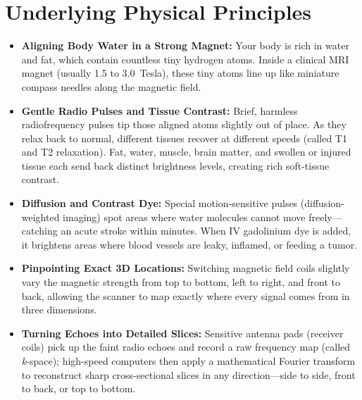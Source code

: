\section{Underlying Physical Principles}
\begin{itemize}
\item \textbf{Aligning Body Water in a Strong Magnet:} Your body is rich in water and fat, which contain countless tiny hydrogen atoms. Inside a clinical MRI magnet (usually 1.5 to 3.0~Tesla), these tiny atoms line up like miniature compass needles along the magnetic field.
\item \textbf{Gentle Radio Pulses and Tissue Contrast:} Brief, harmless radiofrequency pulses tip those aligned atoms slightly out of place. As they relax back to normal, different tissues recover at different speeds (called T1 and T2 relaxation). Fat, water, muscle, brain matter, and swollen or injured tissue each send back distinct brightness levels, creating rich soft-tissue contrast.
\item \textbf{Diffusion and Contrast Dye:} Special motion-sensitive pulses (diffusion-weighted imaging) spot areas where water molecules cannot move freely---catching an acute stroke within minutes. When IV gadolinium dye is added, it brightens areas where blood vessels are leaky, inflamed, or feeding a tumor.
\item \textbf{Pinpointing Exact 3D Locations:} Switching magnetic field coils slightly vary the magnetic strength from top to bottom, left to right, and front to back, allowing the scanner to map exactly where every signal comes from in three dimensions.
\item \textbf{Turning Echoes into Detailed Slices:} Sensitive antenna pads (receiver coils) pick up the faint radio echoes and record a raw frequency map (called \textit{k}-space); high-speed computers then apply a mathematical Fourier transform to reconstruct sharp cross-sectional slices in any direction---side to side, front to back, or top to bottom.
\end{itemize}

